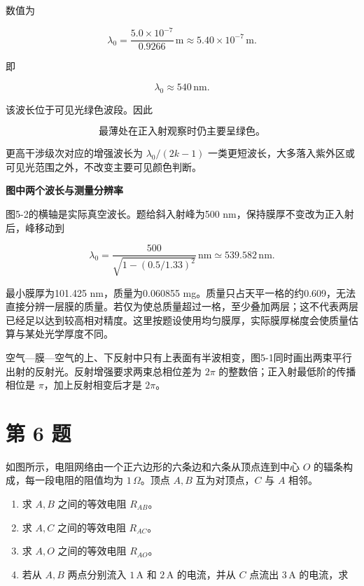 \documentclass[12pt,a4paper,UTF8]{ctexart}
\newcommand{\tightlist}{\setlength{\itemsep}{0pt}\setlength{\parskip}{0pt}}
\begin{document}
数值为

\[\lambda_0
=\frac{5.0\times10^{-7}}{0.9266}\,\mathrm m
\approx5.40\times10^{-7}\,\mathrm m.\]

即

\[\lambda_0\approx540\,\mathrm{nm}.\]

该波长位于可见光绿色波段。因此

\[\boxed{\text{最薄处在正入射观察时仍主要呈绿色。}}\]

更高干涉级次对应的增强波长为 \(\lambda_0/(2k-1)\)
一类更短波长，大多落入紫外区或可见光范围之外，不改变主要可见颜色判断。

\textbf{图中两个波长与测量分辨率}

图5-2的横轴是实际真空波长。题给斜入射峰为500
nm，保持膜厚不变改为正入射后，峰移动到

\[\lambda_0=\frac{500}{\sqrt{1-(0.5/1.33)^2}}\,\mathrm{nm}
\simeq539.582\,\mathrm{nm}.\]

最小膜厚为101.425 nm，质量为0.060855
mg。质量只占天平一格的约0.609，无法直接分辨一层膜的质量。若仅为使总质量超过一格，至少叠加两层；这不代表两层已经足以达到较高相对精度。这里按题设使用均匀膜厚，实际膜厚梯度会使质量估算与某处光学厚度不同。

空气---膜---空气的上、下反射中只有上表面有半波相变，图5-1同时画出两束平行出射的反射光。反射增强要求两束总相位差为
\(2\pi\) 的整数倍；正入射最低阶的传播相位是 \(\pi\)，加上反射相变后才是
\(2\pi\)。

\newpage

\section{第 6 题}\label{ux7b2c-6-ux9898}

如图所示，电阻网络由一个正六边形的六条边和六条从顶点连到中心 \(O\)
的辐条构成，每一段电阻的阻值均为 \(1\,\Omega\)。顶点 \(A,B\)
互为对顶点，\(C\) 与 \(A\) 相邻。

\begin{enumerate}
\def\labelenumi{\arabic{enumi}.}
\tightlist
\item
  求 \(A,B\) 之间的等效电阻 \(R_{AB}\)。
\item
  求 \(A,C\) 之间的等效电阻 \(R_{AC}\)。
\item
  求 \(A,O\) 之间的等效电阻 \(R_{AO}\)。
\item
  若从 \(A,B\) 两点分别流入 \(1\,\mathrm A\) 和 \(2\,\mathrm A\)
  的电流，并从 \(C\) 点流出 \(3\,\mathrm A\) 的电流，求
\end{enumerate}
\end{document}
